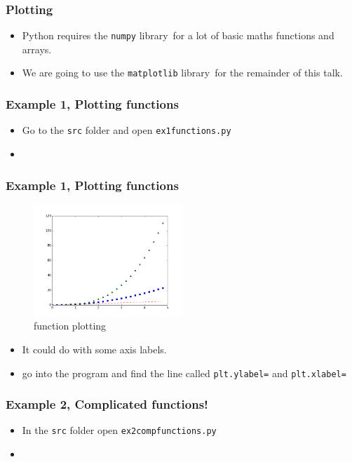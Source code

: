 \documentclass{beamer}
\begin{document}
\begin{frame}
\frametitle{Plotting}
\begin{itemize}
	\item Python requires the \texttt{numpy} library\footnotemark\ for a lot of basic maths functions and arrays.
	\item We are going to use the \texttt{matplotlib} library\footnotemark\ for the remainder of this talk. 
\end{itemize}
\end{frame}

\begin{frame}
\frametitle{Example 1, Plotting functions}
\begin{itemize}
	\item Go to the \texttt{src} folder and open \texttt{ex1functions.py} 
	\item  
\end{itemize}
\end{frame}

\begin{frame}
\frametitle{Example 1, Plotting functions}
\begin{figure}
	\centering
	\includegraphics[width=0.5\textwidth]{ex1.png}
	\caption{function plotting}
	\label{fig:function}
\end{figure}
\begin{itemize}
	\item It could do with some axis labels. 
	\item go into the program and find the line called \texttt{plt.ylabel=} and \texttt{plt.xlabel=}  
\end{itemize}
\end{frame}

\begin{frame}
\frametitle{Example 2, Complicated functions!}
\begin{itemize}
\item In the \texttt{src} folder open \texttt{ex2compfunctions.py} 
\item
\end{itemize}
\end{frame}
\end{document}
